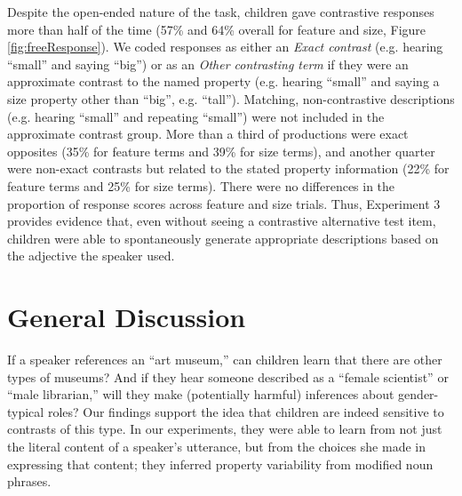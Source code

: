 \documentclass[man]{apa2}
\begin{document}
Despite the open-ended nature of the task, children gave contrastive responses more than half of the time (57\% and 64\% overall for feature and size, Figure \ref{fig:freeResponse}).  We coded responses as either an \emph{Exact contrast} (e.g. hearing ``small'' and saying ``big'') or as an \emph{Other contrasting term} if they were an approximate contrast to the named property (e.g. hearing ``small'' and saying a size property other than ``big'', e.g. ``tall''). Matching, non-contrastive descriptions (e.g. hearing ``small'' and repeating ``small'') were not included in the approximate contrast group. More than a third of productions were exact opposites (35\% for feature terms and 39\% for size terms), and another quarter were non-exact contrasts but related to the stated property information (22\% for feature terms and 25\% for size terms). There were no differences in the proportion of response scores across feature and size trials. Thus, Experiment 3 provides evidence that, even without seeing a contrastive alternative test item, children were able to spontaneously generate appropriate descriptions based on the adjective the speaker used. 

\section{General Discussion}

If a speaker references an ``art museum,'' can children learn that there are other types of museums? And if they hear someone described as a ``female scientist'' or ``male librarian,'' will they make (potentially harmful) inferences about gender-typical roles? Our findings support the idea that children are indeed sensitive to contrasts of this type. In our experiments, they were able to learn from not just the literal content of a speaker's utterance, but from the choices she made in expressing that content; they inferred property variability from modified noun phrases.
\end{document}
